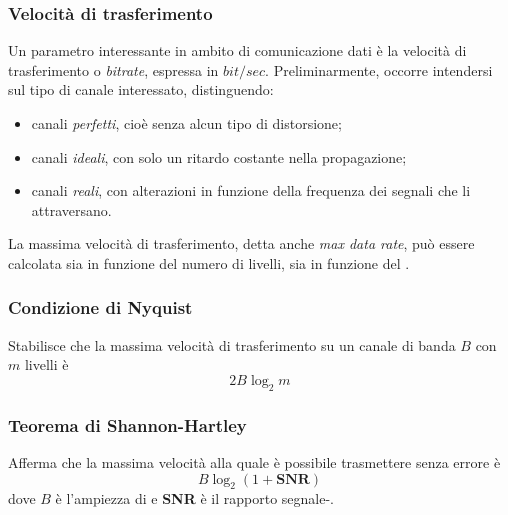 \documentclass[a4paper, twoside]{article}
\def\subsub#1{\subsubsection{#1}\label{#1}}
\def\vedi#1{\nameref{#1}}
\begin{document}
\subsubsection{Velocità di trasferimento}
Un parametro interessante in ambito di comunicazione dati è la velocità di trasferimento o \textit{bitrate}, espressa in $bit/sec$. Preliminarmente, occorre intendersi sul tipo di canale interessato, distinguendo:
\begin{itemize}
\item canali \textit{perfetti}, cioè senza alcun tipo di distorsione;
\item canali \textit{ideali}, con solo un ritardo costante nella propagazione;
\item canali \textit{reali}, con alterazioni in funzione della frequenza dei segnali che li attraversano.
\end{itemize}
La massima velocità di trasferimento, detta anche \textit{max data rate}, può essere calcolata sia in funzione del numero di livelli, sia in funzione del \vedi{Rumore}.
\subsub{Condizione di Nyquist}
Stabilisce che la massima velocità di trasferimento su un canale di banda $B$ con $m$ livelli è
\[2B\log_{2}m\]

\subsub{Teorema di Shannon-Hartley}
Afferma che la massima velocità alla quale è possibile trasmettere senza errore è
\[B\log_{2}(1+\textbf{SNR})\]
dove $B$ è l'ampiezza di \vedi{Banda} e \textbf{SNR} è il rapporto segnale-\vedi{Rumore}.
\end{document}
